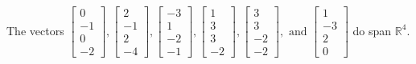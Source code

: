 \begin{exercise}
\begin{exerciseStatement}
  \end{exerciseStatement}
  \begin{exerciseAnswer}
   The vectors \(\left[\begin{array}{r}
0 \\
-1 \\
0 \\
-2
\end{array}\right] , \left[\begin{array}{r}
2 \\
-1 \\
2 \\
-4
\end{array}\right] , \left[\begin{array}{r}
-3 \\
1 \\
-2 \\
-1
\end{array}\right] , \left[\begin{array}{r}
1 \\
3 \\
3 \\
-2
\end{array}\right] , \left[\begin{array}{r}
3 \\
3 \\
-2 \\
-2
\end{array}\right] , \text{ and } \left[\begin{array}{r}
1 \\
-3 \\
2 \\
0
\end{array}\right]\) 
  	 do  
	span \(\mathbb{R}^4\).
  


  \end{exerciseAnswer}
\end{exercise}